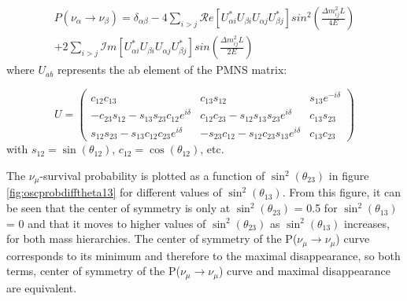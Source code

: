 
\begin{equation}
\begin{array}{r}
P(\nu_{\alpha}\rightarrow\nu_{\beta}) = \delta_{\alpha\beta} - 4 \displaystyle\sum_{i>j} \mathcal{R}e \left[ U_{\alpha i}^{*}U_{\beta i}U_{\alpha j} U_{\beta j}^{*} \right] sin^{2}\left(\frac{\Delta m_{ij}^{2} L}{4E}\right)\\
+2\displaystyle\sum_{i>j} \mathcal{I}m \left[ U_{\alpha i}^{*}U_{\beta i}U_{\alpha j} U_{\beta j}^{*} \right] sin\left(\frac{\Delta m_{ij}^{2} L}{2E}\right)
\end{array}
\label{eq:nuanub3foscprob}
\end{equation}
where $U_{ab}$ represents the ab element of the PMNS matrix:

\begin{equation}
U = \left(
\begin{array}{ccc}
c_{12}c_{13} & c_{13}s_{12} & s_{13}e^{-i\delta} \\
-c_{23}s_{12} - s_{13}s_{23}c_{12}e^{i\delta} & c_{12}c_{23} - s_{12}s_{13}s_{23}e^{i\delta} & c_{13}s_{23} \\
s_{12}s_{23} - s_{13}c_{12}c_{23}e^{i\delta} & -s_{23}c_{12} - s_{12}c_{23}s_{13}e^{i\delta} & c_{13}c_{23}
\end{array} \right)
\label{eq:PMNSmatrix}
\end{equation}
with $s_{12} = \sin(\theta_{12})$, $c_{12} = \cos(\theta_{12})$, etc. 

The $\nu_{\mu}$-survival probability is plotted as a function of $\sin^{2}(\theta_{23})$ in figure \ref{fig:oscprobdifftheta13} for different values 
of $\sin^{2}(\theta_{13})$. From this figure, it can be seen that the center of symmetry is only at $\sin^{2}(\theta_{23})$ = 0.5 for 
$\sin^{2}(\theta_{13})$ = 0 and that it moves to higher values of $\sin^{2}(\theta_{23})$ as $\sin^{2}(\theta_{13})$ increases, for both mass hierarchies.
The center of symmetry of the P($\nu_{\mu}\rightarrow\nu_{\mu}$) curve corresponds to its minimum and therefore to the maximal disappearance,
so both terms, center of symmetry of the P($\nu_{\mu}\rightarrow\nu_{\mu}$) curve and maximal disappearance are equivalent.


